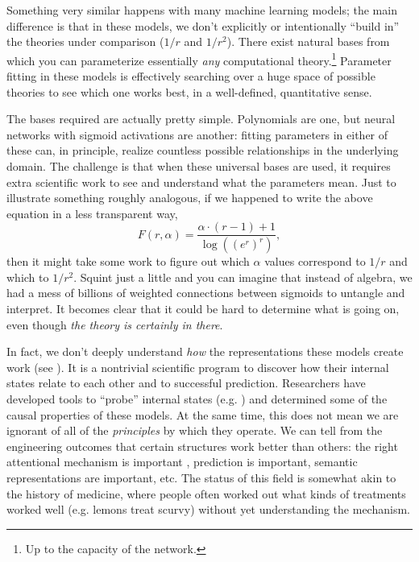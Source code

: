 \documentclass[output=paper,colorlinks,citecolor=brown
]{langscibook}
\begin{document}
Something very similar happens with many machine learning models; the main difference is that in these models, we don't explicitly or intentionally ``build in'' the theories under comparison ($1/r$ and $1/r^2$). There exist natural bases from which you can parameterize essentially \textit{any} computational theory.\footnote{Up to the capacity of the network.} Parameter fitting in these models is effectively searching over a huge space of possible theories to see which one works best, in a well-defined, quantitative sense. 

The bases required are actually pretty simple. Polynomials are one, but neural networks with sigmoid activations are another: fitting parameters in either of these can, in principle, realize countless possible relationships in the underlying domain. The challenge is that when these universal bases are used, it requires extra scientific work to see and understand what the parameters mean. Just to illustrate something roughly analogous, if we happened to write the above equation in a less transparent way, 
$$
F(r,\alpha) = \frac{\alpha \cdot (r-1) + 1}{\log \left(\left(e^r\right)^{r}\right)},
$$
then it might take some work to figure out which $\alpha$ values correspond to $1/r$ and which to $1/r^2$. Squint just a little and you can imagine that instead of algebra, we had a mess of billions of weighted connections between sigmoids to untangle and interpret. It becomes clear that it could be hard to determine what is going on, even though \textit{the theory is certainly in there}. %

In fact, we don't deeply understand \textit{how} the representations these models create work (see \citealt{rogers2021primer}). It is a nontrivial scientific program to discover how their internal states relate to each other and to successful prediction. Researchers have developed tools to ``probe'' internal states (e.g. \citealt{belinkov2019analysis,tenney2019you,kim2019probing,linzen2021syntactic,warstadt2022artificial,pavlick2022semantic}) and determined some of the causal properties of these models. At the same time, this does not mean we are ignorant of all of the \textit{principles} by which they operate. We can tell from the engineering outcomes that certain structures work better than others: the right attentional mechanism is important \citep{vaswani2017attention}, prediction is important, semantic representations are important, etc. The status of this field is somewhat akin to the history of medicine, where people often worked out what kinds of treatments worked well (e.g. lemons treat scurvy) without yet understanding the mechanism. 
\end{document}
